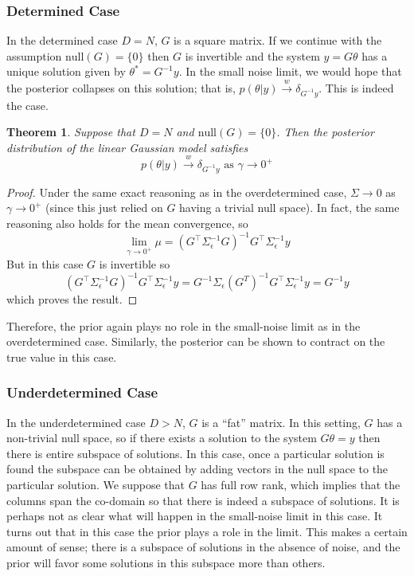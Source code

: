 \documentclass[12pt]{article}
\newtheorem{thm}{Theorem}
\begin{document}
\subsubsection{Determined Case}
In the determined case $D = N$, $G$ is a square matrix. If we continue with the assumption $\text{null}(G) = \{0\}$ then $G$ is invertible and the system $y = G\theta$ has 
a unique solution given by $\theta^* = G^{-1}y$. In the small noise limit, we would hope that the posterior collapses on this solution; that is, 
$p(\theta|y) \overset{w}{\to} \delta_{G^{-1}y}$. This is indeed the case. 

\begin{thm}
Suppose that $D = N$ and $\text{null}(G) = \{0\}$. Then the posterior distribution of the linear Gaussian model satisfies
\[p(\theta|y) \overset{w}{\to} \delta_{G^{-1}y} \text{ as } \gamma \to 0^+\]
\end{thm}

\begin{proof}
Under the same exact reasoning as in the overdetermined case, $\Sigma \to 0$ as $\gamma \to 0^+$ (since this just relied on $G$ having a trivial null space). In fact, the 
same reasoning also holds for the mean convergence, so 
\[\lim_{\gamma \to 0^+} \mu = \left(G^{\top} \Sigma_{\epsilon}^{-1} G \right)^{-1} G^{\top} \Sigma_{\epsilon}^{-1} y\]
But in this case $G$ is invertible so 
\[\left(G^{\top} \Sigma_{\epsilon}^{-1} G \right)^{-1} G^{\top} \Sigma_{\epsilon}^{-1} y = G^{-1} \Sigma_{\epsilon} \left(G^{T}\right)^{-1} G^{\top} \Sigma_{\epsilon}^{-1} y = G^{-1}y\]
which proves the result. 
\end{proof}
Therefore, the prior again plays no role in the small-noise limit as in the overdetermined case. Similarly, the posterior can be shown to contract on the true value in this case. 

\subsubsection{Underdetermined Case}
In the underdetermined case $D > N$, $G$ is a ``fat'' matrix. In this setting, $G$ has a non-trivial null space, so if there exists a solution to the system $G\theta = y$ then there 
is entire subspace of solutions. In this case, once a particular solution is found the subspace can be obtained by adding vectors in the null space to the particular solution. 
We suppose that $G$ has full row rank, which implies that the columns span the co-domain so that there is indeed a subspace of solutions.
It is perhaps not as clear what will happen in the small-noise limit in this case. It turns out that in this case the prior plays a role in the limit. This makes a certain amount of sense; 
there is a subspace of solutions in the absence of noise, and the prior will favor some solutions in this subspace more than others. 
\end{document}
